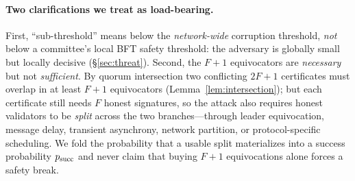 \paragraph{Two clarifications we treat as load-bearing.}
First, ``sub-threshold'' means below the \emph{network-wide} corruption threshold, \emph{not}
below a committee's local BFT safety threshold: the adversary is globally small but locally
decisive (\S\ref{sec:threat}). Second, the $F+1$ equivocators are \emph{necessary} but not
\emph{sufficient}. By quorum intersection two conflicting $2F{+}1$ certificates must overlap in at
least $F{+}1$ equivocators (Lemma~\ref{lem:intersection}); but each certificate still needs $F$
honest signatures, so the attack also requires honest validators to be \emph{split} across the
two branches---through leader equivocation, message delay, transient asynchrony, network
partition, or protocol-specific scheduling. We fold the probability that a usable split
materializes into a success probability $p_{\mathrm{succ}}$ and never claim that buying $F+1$ equivocations
alone forces a safety break.

